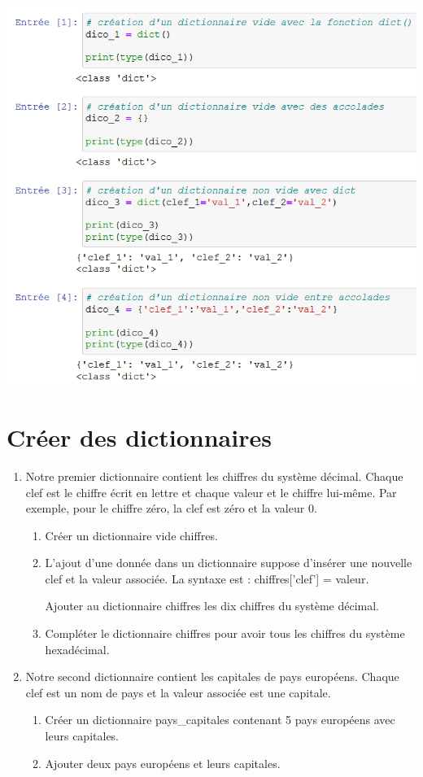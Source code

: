 \documentclass[12pt,a4paper]{article}
\begin{document}
\begin{center}
\includegraphics[scale=0.8]{img/creer_dictionnaire.png}
\end{center}

\section*{Créer des dictionnaires}

\begin{enumerate}
\item Notre premier dictionnaire contient les chiffres du système décimal. Chaque clef est le chiffre écrit en lettre et chaque valeur et le chiffre lui-même. Par exemple, pour le chiffre zéro, la clef est \textsf{zéro} et la valeur \textsf{0}.

\begin{enumerate}
\item Créer un dictionnaire vide \textsf{chiffres}.
\item L'ajout d'une donnée dans un dictionnaire suppose d'insérer une nouvelle clef et la valeur associée. La syntaxe est : \textsf{chiffres['clef'] = valeur}.

Ajouter au dictionnaire \textsf{chiffres} les dix chiffres du système décimal.

\item Compléter le dictionnaire \textsf{chiffres} pour avoir tous les chiffres du système hexadécimal.
\end{enumerate}

\item Notre second dictionnaire contient les capitales de pays européens. Chaque clef est un nom de pays et la valeur associée est une capitale.

\begin{enumerate}
\item Créer un dictionnaire \textsf{pays\_capitales} contenant 5 pays européens avec leurs capitales.
\item Ajouter deux pays européens et leurs capitales.
\end{enumerate}
\end{enumerate}
\end{document}
